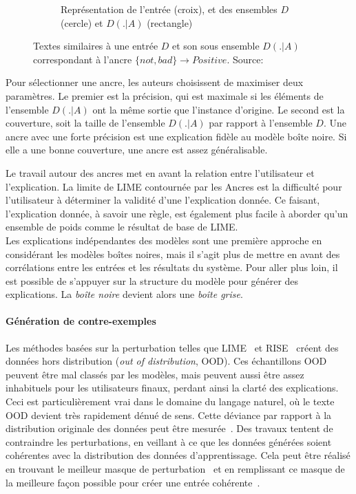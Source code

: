 \begin{figure}[htpb!]
\begin{subfigure}[b]{0.20\textwidth}
       \caption{Représentation de l'entrée (croix), et des ensembles $D$ (cercle) et $D(.|A)$ (rectangle)}\label{fig:anchors_domain_2}
    \end{subfigure}
    \caption{Textes similaires à une entrée $D$ et son sous ensemble $D(.|A)$ correspondant à l'ancre $\{not, bad\} \rightarrow Positive $. Source:~\cite{Ribeiro2018}}
    \label{fig:anchors_domain}
\end{figure}

Pour sélectionner une ancre, les auteurs choisissent de maximiser deux paramètres. Le premier est la précision, qui est maximale si les éléments de l'ensemble $D(.|A)$ ont la même sortie que l'instance d'origine. Le second est la couverture, soit la taille de l'ensemble $D(.|A)$ par rapport à l'ensemble $D$. Une ancre avec une forte précision est une explication fidèle au modèle boîte noire. Si elle a une bonne couverture, une ancre est assez généralisable.

Le travail autour des ancres met en avant la relation entre l'utilisateur et l'explication. La limite de LIME contournée par les Ancres est la difficulté pour l'utilisateur à déterminer la validité d'une l'explication donnée. Ce faisant, l'explication donnée, à savoir une règle, est également plus facile à aborder qu'un ensemble de poids comme le résultat de base de LIME.\\

Les explications indépendantes des modèles sont une première approche en considérant les modèles boîtes noires, mais il s'agit plus de mettre en avant des corrélations entre les entrées et les résultats du système.
Pour aller plus loin, il est possible de s'appuyer sur la structure du modèle pour générer des explications. La \textit{boîte noire} devient alors une \textit{boîte grise}.

\paragraph{Génération de contre-exemples}
Les méthodes basées sur la perturbation telles que LIME~\cite{Ribeiro2016} et RISE~\cite{Petsiuk2018} créent des données hors distribution (\textit{out of distribution}, OOD). Ces échantillons OOD peuvent être mal classés par les modèles, mais peuvent aussi être assez inhabituels pour les utilisateurs finaux, perdant ainsi la clarté des explications. Ceci est particulièrement vrai dans le domaine du langage naturel, où le texte OOD devient très rapidement dénué de sens. Cette déviance par rapport à la distribution originale des données peut être mesurée~\cite{Qiu2021}.
Des travaux tentent de contraindre les perturbations, en veillant à ce que les données générées soient cohérentes avec la distribution des données d'apprentissage. Cela peut être réalisé en trouvant le meilleur masque de perturbation~\cite{Chang2019} et en remplissant ce masque de la meilleure façon possible pour créer une entrée cohérente~\cite{Agarwal2020}.


